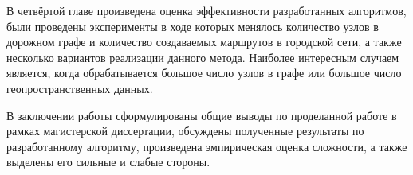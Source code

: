 В четвёртой главе произведена оценка эффективности разработанных алгоритмов, были проведены эксперименты в 
ходе которых менялось количество узлов в дорожном графе и количество создаваемых маршрутов в городской сети, 
а также несколько вариантов реализации данного метода. Наиболее интересным случаем является, когда 
обрабатывается большое число узлов в графе или большое число геопространственных данных.

В заключении работы сформулированы общие выводы по проделанной работе в рамках магистерской диссертации, 
обсуждены полученные результаты по разработанному алгоритму, произведена эмпирическая оценка сложности, а 
также выделены его сильные и слабые стороны.